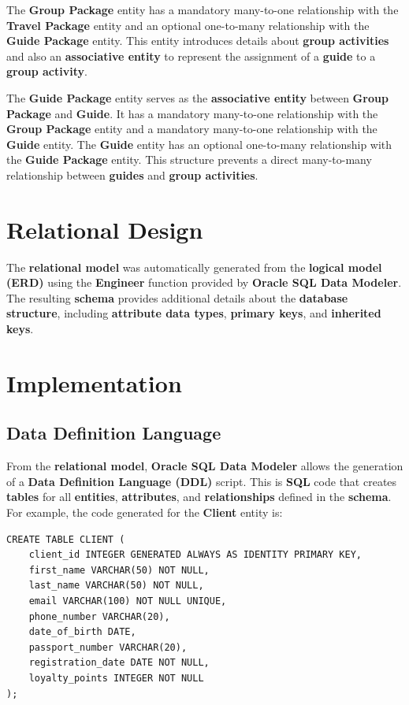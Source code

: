 \documentclass{article}
\begin{document}
The \textbf{Group Package} entity has a mandatory many-to-one relationship with the \textbf{Travel Package} entity and an optional one-to-many relationship with the \textbf{Guide Package} entity. This entity introduces details about \textbf{group activities} and also an \textbf{associative entity} to represent the assignment of a \textbf{guide} to a \textbf{group activity}.

The \textbf{Guide Package} entity serves as the \textbf{associative entity} between \textbf{Group Package} and \textbf{Guide}. It has a mandatory many-to-one relationship with the \textbf{Group Package} entity and a mandatory many-to-one relationship with the \textbf{Guide} entity. The \textbf{Guide} entity has an optional one-to-many relationship with the \textbf{Guide Package} entity. This structure prevents a direct many-to-many relationship between \textbf{guides} and \textbf{group activities}.

\section{Relational Design}
The \textbf{relational model} was automatically generated from the \textbf{logical model (ERD)} using the \textbf{Engineer} function provided by \textbf{Oracle SQL Data Modeler}. The resulting \textbf{schema} provides additional details about the \textbf{database structure}, including \textbf{attribute data types}, \textbf{primary keys}, and \textbf{inherited keys}.

\section{Implementation}

\subsection{Data Definition Language}
From the \textbf{relational model}, \textbf{Oracle SQL Data Modeler} allows the generation of a \textbf{Data Definition Language (DDL)} script. This is \textbf{SQL} code that creates \textbf{tables} for all \textbf{entities}, \textbf{attributes}, and \textbf{relationships} defined in the \textbf{schema}. For example, the code generated for the \textbf{Client} entity is:

\begin{lstlisting}
CREATE TABLE CLIENT (
    client_id INTEGER GENERATED ALWAYS AS IDENTITY PRIMARY KEY,
    first_name VARCHAR(50) NOT NULL,
    last_name VARCHAR(50) NOT NULL,
    email VARCHAR(100) NOT NULL UNIQUE,
    phone_number VARCHAR(20),
    date_of_birth DATE,
    passport_number VARCHAR(20),
    registration_date DATE NOT NULL,
    loyalty_points INTEGER NOT NULL
);
\end{lstlisting}
\end{document}
